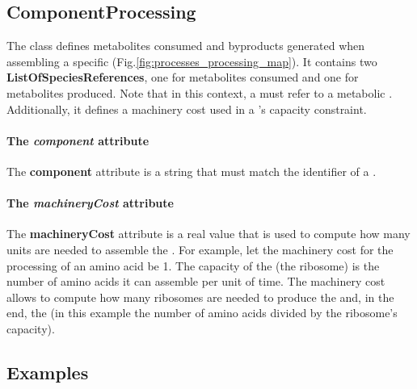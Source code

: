 \subsection{ComponentProcessing}
\label{sec:component_processing}

The \componentprocessing{} class defines metabolites consumed and byproducts
generated when assembling a specific \component{}
(Fig.\ref{fig:processes_processing_map}).
It contains two \textbf{ListOfSpeciesReferences}, one for metabolites
consumed and one for metabolites produced.
Note that in this context, a \speciesreference{} must refer to a
metabolic \species.
Additionally, it defines a machinery cost used in a \machinery{}'s
capacity constraint.

\paragraph{The \textit{component} attribute}
The \textbf{component} attribute is a string that must match the identifier
of a \component{}.

\paragraph{The \textit{machineryCost} attribute}
The \textbf{machineryCost} attribute is a real value that is used to
compute how many \machinery{} units are needed to assemble the \component{}.
For example, let the machinery cost for the processing of an amino acid be 1.
The capacity of the \machinery{} (the ribosome) is the number of amino acids
it can assemble per unit of time.
The machinery cost allows to compute how many ribosomes are needed
to produce the \component{} and, in the end, the \macromolecule{}
(in this example the number of amino acids divided by the ribosome's capacity).

\subsection{Examples}

